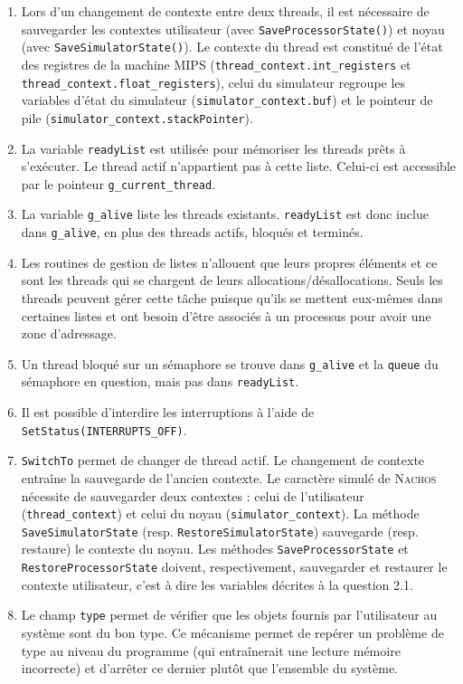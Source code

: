 \documentclass[a4paper,11pt,french]{article}
\begin{document}
\begin{enumerate}
\item Lors d'un changement de contexte entre deux threads, il est nécessaire de sauvegarder les contextes utilisateur (avec \texttt{SaveProcessorState()}) et noyau (avec \texttt{SaveSimulatorState()}). Le contexte du thread est constitué de l'état des registres de la machine MIPS (\texttt{thread\_context.int\_registers} et \texttt{thread\_context.float\_registers}), celui du simulateur regroupe les variables d'état du simulateur (\texttt{simulator\_context.buf}) et le pointeur de pile (\texttt{simulator\_context.stackPointer}).
\item La variable \texttt{readyList} est utilisée pour mémoriser les threads prêts à s'exécuter. Le thread actif n'appartient pas à cette liste. Celui-ci est accessible par le pointeur \texttt{g\_current\_thread}.
\item La variable \texttt{g\_alive} liste les threads existants. \texttt{readyList} est donc inclue dans \texttt{g\_alive}, en plus des threads actifs, bloqués et terminés.
\item Les routines de gestion de listes n'allouent que leurs propres éléments et ce sont les threads qui se chargent de leurs allocations/désallocations. Seuls les threads peuvent gérer cette tâche puisque qu'ils se mettent eux-mêmes dans certaines listes et ont besoin d'être associés à un processus pour avoir une zone d'adressage.
\item Un thread bloqué sur un sémaphore se trouve dans \texttt{g\_alive} et la \texttt{queue} du sémaphore en question, mais pas dans \texttt{readyList}.
\item Il est possible d'interdire les interruptions à l'aide de \texttt{SetStatus(INTERRUPTS\_OFF)}.
\item \texttt{SwitchTo} permet de changer de thread actif. Le changement de contexte entraîne la sauvegarde de l'ancien contexte. Le caractère simulé de \textsc{Nachos} nécessite de sauvegarder deux contextes : celui de l'utilisateur (\texttt{thread\_context}) et celui du noyau (\texttt{simulator\_context}). La méthode \texttt{SaveSimulatorState} (resp. \texttt{RestoreSimulatorState}) sauvegarde (resp. restaure) le contexte du noyau. Les méthodes \texttt{SaveProcessorState} et \texttt{RestoreProcessorState} doivent, respectivement, sauvegarder et restaurer le contexte utilisateur, c'est à dire les variables décrites à la question 2.1.
\item Le champ \texttt{type} permet de vérifier que les objets fournis par l'utilisateur au système sont du bon type. Ce mécanisme permet de repérer un problème de type au niveau du programme (qui entraînerait une lecture mémoire incorrecte) et d'arrêter ce dernier plutôt que l'ensemble du système.
\end{enumerate}
\end{document}
